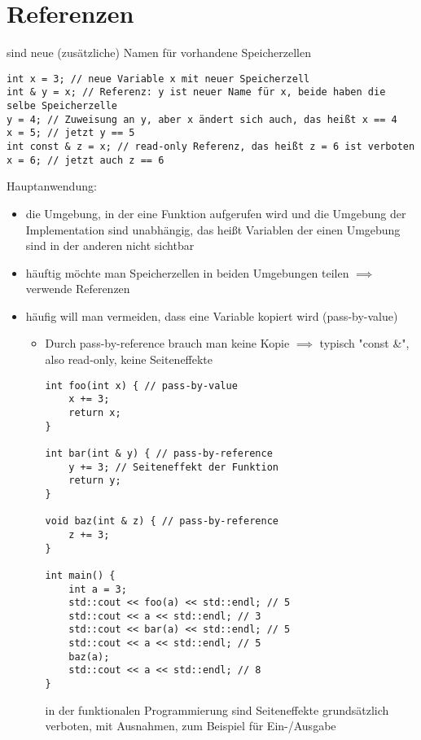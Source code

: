 \documentclass[a4paper]{scrartcl}
\theoremstyle{definition}
\theoremstyle{plain}
\theoremstyle{remark}
\theoremstyle{remark}
\begin{document}
\section{Referenzen}
\label{sec-10}
sind neue (zusätzliche) Namen für vorhandene Speicherzellen
\begin{verbatim}
int x = 3; // neue Variable x mit neuer Speicherzell
int & y = x; // Referenz: y ist neuer Name für x, beide haben die selbe Speicherzelle
y = 4; // Zuweisung an y, aber x ändert sich auch, das heißt x == 4
x = 5; // jetzt y == 5
int const & z = x; // read-only Referenz, das heißt z = 6 ist verboten
x = 6; // jetzt auch z == 6
\end{verbatim}
Hauptanwendung:
\begin{itemize}
\item die Umgebung, in der eine Funktion aufgerufen wird und die Umgebung der Implementation sind unabhängig, das heißt Variablen der einen Umgebung sind in der anderen nicht sichtbar
\item häuftig möchte man Speicherzellen in beiden Umgebungen teilen $\implies$ verwende Referenzen
\item häufig will man vermeiden, dass eine Variable kopiert wird (pass-by-value)
\begin{itemize}
\item Durch pass-by-reference brauch man keine Kopie $\implies$ typisch "const \&", also read-only, keine Seiteneffekte
\begin{verbatim}
int foo(int x) { // pass-by-value
	x += 3;
	return x;
}

int bar(int & y) { // pass-by-reference
	y += 3; // Seiteneffekt der Funktion
	return y;
}

void baz(int & z) { // pass-by-reference
	z += 3;
}

int main() {
	int a = 3;
	std::cout << foo(a) << std::endl; // 5
	std::cout << a << std::endl; // 3
	std::cout << bar(a) << std::endl; // 5
	std::cout << a << std::endl; // 5
	baz(a);
	std::cout << a << std::endl; // 8
}
\end{verbatim}
in der funktionalen Programmierung sind Seiteneffekte grundsätzlich verboten, 
mit Ausnahmen, zum Beispiel für Ein-/Ausgabe
\end{itemize}
\end{itemize}
\end{document}
